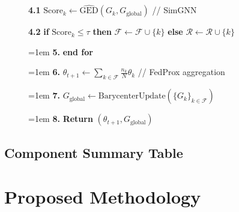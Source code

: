 \documentclass[journal]{IEEEtran}
\begin{document}
\begin{figure}[h]
{\begin{minipage}{0.92\linewidth}
\hspace{2em}\textbf{4.1} $\text{Score}_k \leftarrow \widehat{\text{GED}}(G_k, G_{\text{global}})$ \hfill // SimGNN

\hspace{2em}\textbf{4.2} \textbf{if} $\text{Score}_k \leq \tau$ \textbf{then} $\mathcal{F} \leftarrow \mathcal{F} \cup \{k\}$ \textbf{else} $\mathcal{R} \leftarrow \mathcal{R} \cup \{k\}$

\hangindent=1em
\textbf{5.} \textbf{end for}

\hangindent=1em
\textbf{6.} $\theta_{t+1} \leftarrow \sum_{k \in \mathcal{F}} \frac{n_k}{N} \theta_k$ \hfill // FedProx aggregation

\hangindent=1em
\textbf{7.} $G_{\text{global}} \leftarrow \text{BarycenterUpdate}(\{G_k\}_{k \in \mathcal{F}})$

\hangindent=1em
\textbf{8.} \textbf{Return} $(\theta_{t+1}, G_{\text{global}})$
\end{minipage}%
}
\end{figure}

\subsection{Component Summary Table}

\begin{table}[H]
\centering
\caption{Comparison of standard federated systems and the PoR architecture.}
\end{table}

\newpage
\section{Proposed Methodology}
\end{document}
